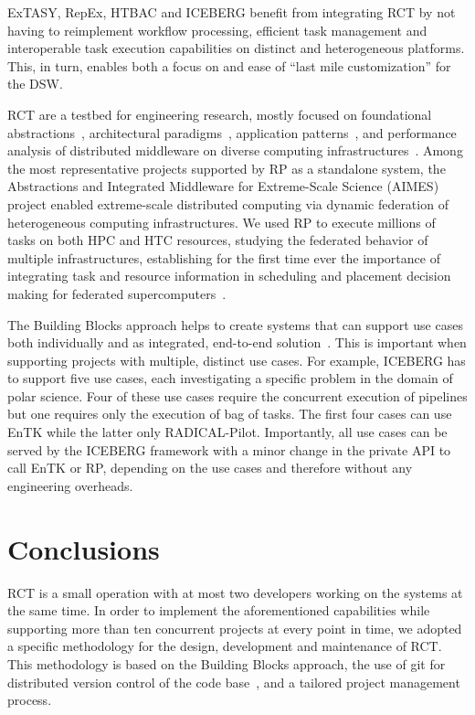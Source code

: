 \documentclass[preprint,12pt, a4paper]{elsarticle}
\begin{document}
ExTASY, RepEx, HTBAC and ICEBERG benefit from integrating RCT by not having
to reimplement workflow processing, efficient task management and
interoperable task execution capabilities on distinct and heterogeneous
platforms. This, in turn, enables both a focus on and ease of ``last mile
customization'' for the DSW\@.

RCT are a testbed for engineering research, mostly focused on foundational
abstractions~\cite{turilli2017evaluating}, architectural
paradigms~\cite{turilli2018comprehensive}, application patterns~\cite{}, and
performance analysis of distributed middleware on diverse computing
infrastructures~\cite{}. Among the most representative projects supported by
RP as a standalone system, the Abstractions and Integrated Middleware for
Extreme-Scale Science (AIMES) project enabled extreme-scale distributed
computing via dynamic federation of heterogeneous computing infrastructures.
We used RP to execute millions of tasks on both HPC and HTC resources,
studying the federated behavior of multiple infrastructures, establishing for
the first time ever the importance of integrating task and resource
information in scheduling and placement decision making for federated
supercomputers~\cite{turilli2016integrating}.

The Building Blocks approach helps to create systems that can support use
cases both individually and as integrated, end-to-end
solution~\cite{turilli2019middleware}. This is important when supporting
projects with multiple, distinct use cases. For example, ICEBERG has to
support five use cases, each investigating a specific problem in the domain
of polar science. Four of these use cases require the concurrent execution of
pipelines but one requires only the execution of bag of tasks. The first four
cases can use EnTK while the latter only RADICAL-Pilot. Importantly, all use
cases can be served by the ICEBERG framework with a minor change in the
private API to call EnTK or RP, depending on the use cases and therefore
without any engineering overheads.


\section{Conclusions}\label{sec:conclusions}

RCT is a small operation with at most two developers working on the systems
at the same time. In order to implement the aforementioned capabilities while
supporting more than ten concurrent projects at every point in time, we
adopted a specific methodology for the design, development and maintenance of
RCT\@. This methodology is based on the Building Blocks approach, the use of
git for distributed version control of the code base~\cite{github-rct}, and a
tailored project management process.
\end{document}
